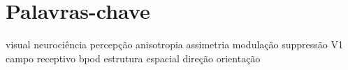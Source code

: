 \section*{Palavras-chave}
visual neurociência percepção anisotropia assimetria modulação suppressão V1 campo receptivo bpod estrutura espacial direção orientação
\clearpage
\thispagestyle{empty}
\cleardoublepage
